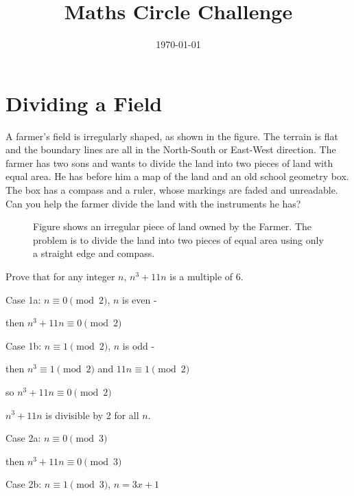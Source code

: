 \documentclass[12pt,answers]{exam}
\date{\today}
\begin{document}
\title{Maths Circle Challenge}
\maketitle
\thispagestyle{empty}
\section*{Dividing a Field}

\begin{questions}
\question A farmer's field is irregularly shaped, as shown in the figure. The terrain is flat and the boundary lines are all in the North-South or East-West direction. The farmer has two sons and wants to divide the land into two pieces of land with equal area. He has before him a map of the land and an old school geometry box. The box has a compass and a ruler, whose markings are faded and unreadable. Can you help the farmer divide the land with the instruments he has?
\begin{figure}[h]
    \centering
    \caption{Figure shows an irregular piece of land owned by the Farmer. The problem is to divide the land into two pieces of equal area using only a straight edge and compass.}
\end{figure}

\question Prove that for any integer $n$, $n^3+11n$ is a multiple of 6.
\begin{solution}
    Case 1a: \( n \equiv 0 \pmod{2}\), $n$ is even - 
    
    then \( n^3+11n \equiv 0 \pmod{2}\)

    Case 1b: \( n \equiv 1 \pmod{2}\), $n$ is odd -

    then \( n^3 \equiv 1 \pmod{2}\) and \( 11n \equiv 1 \pmod{2}\)

    so \(n^3 + 11n \equiv 0 \pmod{2} \)

    \(n^3+11n\) is divisible by 2 for all $n$.

    Case 2a: \(n \equiv 0 \pmod{3} \)

    then \( n^3+11n \equiv 0 \pmod{3}\)
    
    Case 2b: \(n \equiv 1 \pmod{3} \), \(n=3x+1\)
    

\end{solution}
\end{questions}
\end{document}
